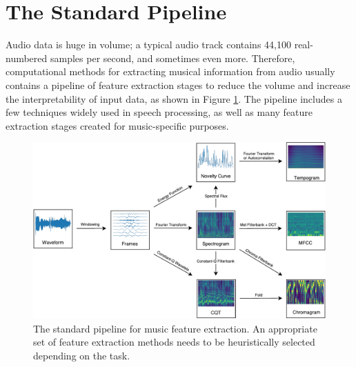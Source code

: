 \section{The Standard Pipeline}

Audio data is huge in volume; a typical audio track contains 44,100 real-numbered samples per second, and sometimes even more.
Therefore, computational methods for extracting musical information from audio usually contains a pipeline of feature extraction stages to reduce the volume and increase the interpretability of input data, as shown in Figure \ref{fig:pipeline}.
The pipeline includes a few techniques widely used in speech processing, as well as many feature extraction stages created for music-specific purposes.

\begin{figure}[t]
	\includegraphics[width=\textwidth]{pipeline.pdf}
	\caption{\small The standard pipeline for music feature extraction. An appropriate set of feature extraction methods needs to be heuristically selected depending on the task.}\label{fig:pipeline}
\end{figure}

